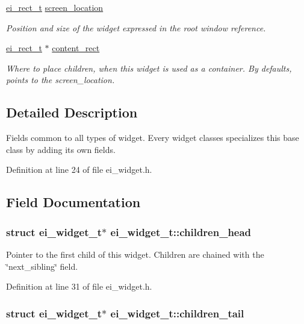 \begin{DoxyCompactItemize}
\hyperlink{structei__rect__t}{ei\_\-rect\_\-t} \hyperlink{structei__widget__t_ad139e1541329b54e0b4c8d746e14b204}{screen\_\-location}
\begin{DoxyCompactList}\small\item\em Position and size of the widget expressed in the root window reference. \item\end{DoxyCompactList}\item 
\hyperlink{structei__rect__t}{ei\_\-rect\_\-t} $\ast$ \hyperlink{structei__widget__t_a75c29d388a5f5b32cdd8a9c855bc2a75}{content\_\-rect}
\begin{DoxyCompactList}\small\item\em Where to place children, when this widget is used as a container. By defaults, points to the screen\_\-location. \item\end{DoxyCompactList}\end{DoxyCompactItemize}


\subsection{Detailed Description}
Fields common to all types of widget. Every widget classes specializes this base class by adding its own fields. 

Definition at line 24 of file ei\_\-widget.h.

\subsection{Field Documentation}
\hypertarget{structei__widget__t_a190316f0ec41d2d98b919414c860f828}{
\subsubsection[{children\_\-head}]{\setlength{\rightskip}{0pt plus 5cm}struct {\bf ei\_\-widget\_\-t}$\ast$ {\bf ei\_\-widget\_\-t::children\_\-head}}}
\label{structei__widget__t_a190316f0ec41d2d98b919414c860f828}


Pointer to the first child of this widget. Children are chained with the \char`\"{}next\_\-sibling\char`\"{} field. 

Definition at line 31 of file ei\_\-widget.h.\hypertarget{structei__widget__t_aece2f3059f252538ae787857e7eea2a2}{
\subsubsection[{children\_\-tail}]{\setlength{\rightskip}{0pt plus 5cm}struct {\bf ei\_\-widget\_\-t}$\ast$ {\bf ei\_\-widget\_\-t::children\_\-tail}}}
\label{structei__widget__t_aece2f3059f252538ae787857e7eea2a2}


